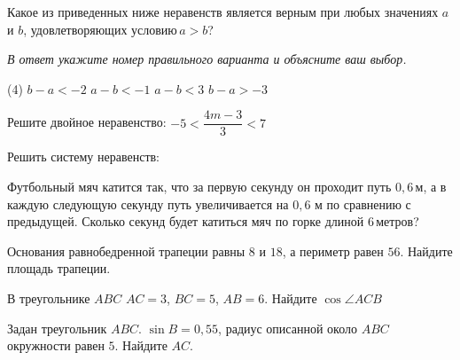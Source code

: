 \begin{homework}[number=2]
	\begin{listofex}
		\item Какое из приведенных ниже неравенств является верным при любых значениях \( a \) и \( b \), удовлетворяющих условию \( a > b \)?
		
		\textit{В ответ укажите номер правильного варианта и объясните ваш выбор.}
		\begin{tasks}(4)
			\task \( b-a < -2 \)
			\task \( a-b < -1 \)
			\task \( a-b < 3 \)
			\task \( b-a > -3 \)
		\end{tasks}
		\item {}
		\item Решите двойное неравенство: \( -5<\dfrac{4m-3}{3}<7 \)
		\item Решить систему неравенств:
		\begin{itasks}[2]
			\task {}
			\task {}
		\end{itasks}
		\item Футбольный мяч катится так, что за первую секунду он проходит путь \( 0,6 \) м, а в каждую следующую секунду путь увеличивается на \( 0,6  \) м по сравнению с предыдущей. Сколько секунд будет катиться мяч по горке длиной 6 метров?
		\item Основания равнобедренной трапеции равны \( 8 \) и \( 18 \), а периметр равен \( 56 \). Найдите площадь трапеции.
		\item В треугольнике \( ABC \) \( AC=3 \), \( BC=5 \), \( AB=6 \). Найдите \( \cos\angle ACB\)
		\item Задан треугольник \( ABC \). \( \sin B=0,55 \), радиус описанной около \( ABC \) окружности равен \( 5 \). Найдите \( AC \).
	\end{listofex}
\end{homework}
%
%
